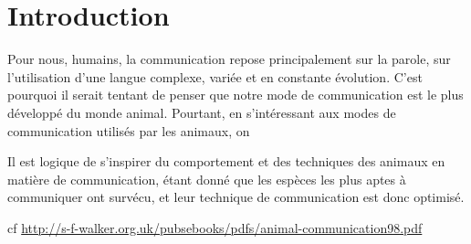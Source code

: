 \section*{Introduction}
%
Pour nous, humains, la communication repose principalement sur la
parole, sur l'utilisation d'une langue complexe, variée et en constante
évolution. C'est pourquoi il serait tentant de penser que notre mode de
communication est le plus développé du monde animal. Pourtant, en
s'intéressant aux modes de communication utilisés par les animaux, on

Il est logique de s'inspirer du comportement et des techniques des
animaux en matière de communication, étant donné que les espèces les
plus aptes à communiquer ont survécu, et leur technique de communication
est donc optimisé.

cf \url{http://s-f-walker.org.uk/pubsebooks/pdfs/animal-communication98.pdf}

